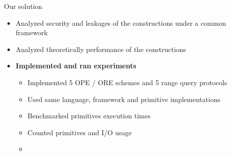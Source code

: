 \begin{frame}[label={frame:ore}]
\begin{columns}[T,onlytextwidth]
{\begin{block}{Our solution}
						\begin{itemize}
							\item Analyzed security and leakages of the constructions under a common framework
							\item Analyzed theoretically performance of the constructions
							\item \textbf{Implemented and ran experiments}
							\begin{itemize}
								\item Implemented 5 OPE / ORE schemes and 5 range query protocols
								\item Used same language, framework and primitive implementations
								\item Benchmarked primitives execution times
								\item Counted primitives and I/O usage
								\item[]
									\hyperlink{frame:appendix:ore}{}
									\hyperlink{frame:appendix:protocols}{}
									\hyperlink{frame:appendix:plot}{}
							\end{itemize}
						\end{itemize}

					\end{block}
				}

		\end{columns}

	\end{frame}
